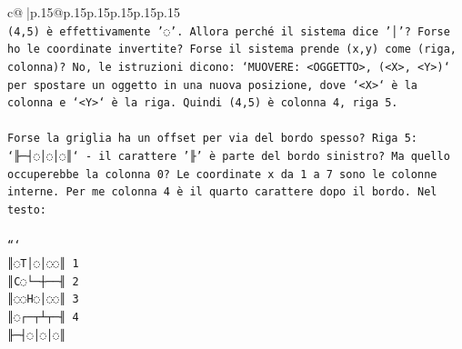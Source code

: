 \documentclass{article}
\begin{document}
{\begin{supertabular}{c@{$\;$}|p{.15\linewidth}@{}p{.15\linewidth}p{.15\linewidth}p{.15\linewidth}p{.15\linewidth}p{.15\linewidth}}
{{{\\ 
\texttt{(4,5) è effettivamente '◌'. Allora perché il sistema dice '│'? Forse ho le coordinate invertite? Forse il sistema prende (x,y) come (riga, colonna)? No, le istruzioni dicono: `MUOVERE: <OGGETTO>, (<X>, <Y>)` per spostare un oggetto in una nuova posizione, dove `<X>` è la colonna e `<Y>` è la riga. Quindi (4,5) è colonna 4, riga 5.} \\
\\ 
\texttt{Forse la griglia ha un offset per via del bordo spesso? Riga 5: `╟─┤◌│◌│◌║` {-} il carattere '╟' è parte del bordo sinistro? Ma quello occuperebbe la colonna 0? Le coordinate x da 1 a 7 sono le colonne interne. Per me colonna 4 è il quarto carattere dopo il bordo. Nel testo:} \\
\\ 
\texttt{```} \\
\texttt{║◌T│◌│◌◌║ 1} \\
\texttt{║C◌└─┼──╢ 2} \\
\texttt{║◌◌H◌│◌◌║ 3} \\
\texttt{║◌┌─┬┴┬─╢ 4} \\
\texttt{╟─┤◌│◌│◌║} \\
            }
        }
    }
     \\ \\


\end{supertabular}}
\end{document}
